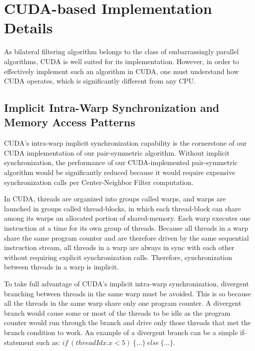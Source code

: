 \documentclass{IEEEtran}
\begin{document}
\section{CUDA-based Implementation Details}
\label{sec:GPUoptimizations} 
As bilateral filtering algorithm belongs to the class of embarrassingly parallel algorithms, CUDA is well suited for its implementation. However,
in order to effectively implement such an algorithm in CUDA, one must understand how CUDA operates, which is significantly different from any CPU.

\subsection{Implicit Intra-Warp Synchronization and Memory Access Patterns}

CUDA's intra-warp implicit synchronization capability is the cornerstone of our CUDA implementation of our pair-symmetric algorithm. Without implicit synchronization, the performance of our CUDA-implemented pair-symmetric algorithm would be significantly reduced because it would require expensive synchronization calls per Center-Neighbor Filter computation.

In CUDA, threads are organized into groups called warps, and warps are launched in groups called thread-blocks, in which each thread-block can share among its warps an allocated portion of shared-memory. Each warp executes one instruction at a time for its own group of threads. Because all threads in a warp share the same program counter and are therefore driven by the same sequential instruction stream, all threads in a warp are always in sync with each other without requiring explicit synchronization calls. Therefore, synchronization between threads in a warp is implicit.

To take full advantage of CUDA's implicit intra-warp synchronization, divergent branching between threads in the same warp must be avoided. This is so because all the threads in the same warp share only one program counter. A divergent branch would cause some or most of the threads to be idle as the program counter would run through the branch and drive only those threads that met the branch condition to work. An example of a divergent branch can be a simple if-statement such as: $if~(threadIdx.x < 5)~\{...\}~else~\{...\}$.
\end{document}

